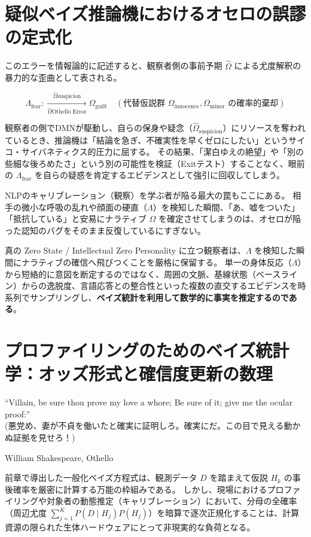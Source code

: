 \section{疑似ベイズ推論機におけるオセロの誤謬の定式化}
このエラーを情報論的に記述すると、観察者側の事前予期 $\hat{\Omega}$ による尤度解釈の暴力的な歪曲として表される。

\begin{equation}
\Lambda_{\mathrm{fear}} :\xrightarrow[\hat{\Omega}{\text{Othello Error}}]{\hat{\Omega}{\mathrm{suspicion}}} \Omega_{\mathrm{guilt}} \quad (\text{代替仮説群 } \Omega_{\mathrm{innocence}}, \Omega_{\mathrm{minor}} \text{ の確率的棄却})
\end{equation}

観察者の側でDMNが駆動し、自らの保身や疑念（$\hat{\Omega}_{\mathrm{suspicion}}$）にリソースを奪われているとき、推論機は「結論を急ぎ、不確実性を早くゼロにしたい」というサイコ・サイバネティクス的圧力に屈する。
その結果、「潔白ゆえの絶望」や「別の些細な後ろめたさ」という別の可能性を検証（Exitテスト）することなく、眼前の $\Lambda_{\mathrm{fear}}$ を自らの疑惑を肯定するエビデンスとして強引に回収してしまう。

NLPのキャリブレーション（観察）を学ぶ者が陥る最大の罠もここにある。
相手の微小な呼吸の乱れや顔面の硬直（$\Lambda$）を検知した瞬間、「あ、嘘をついた」「抵抗している」と安易にナラティブ $\Omega$ を確定させてしまうのは、オセロが陥った認知のバグをそのまま反復しているにすぎない。

真の Zero State / Intellectual Zero Personality に立つ観察者は、$\Lambda$ を検知した瞬間にナラティブの確信へ飛びつくことを厳格に保留する。
単一の身体反応（$\Lambda$）から短絡的に意図を断定するのではなく、周囲の文脈、基線状態（ベースライン）からの逸脱度、言語応答との整合性といった複数の直交するエビデンスを時系列でサンプリングし、\textbf{ベイズ統計を利用して数学的に事実を推定するのである}。

\section{プロファイリングのためのベイズ統計学：オッズ形式と確信度更新の数理}
\epigraph{``Villain, be sure thou prove my love a whore;
Be sure of it; give me the ocular proof:''\\(悪党め、妻が不貞を働いたと確実に証明しろ。確実にだ。この目で見える動かぬ証拠を見せろ！)}{William Shakespeare, Othello}
前章で導出した一般化ベイズ方程式は、観測データ $D$ を踏まえて仮説 $H_k$ の事後確率を厳密に計算する万能の枠組みである。
しかし、現場におけるプロファイリングや対象者の動態推定（キャリブレーション）において、分母の全確率（周辺尤度 $\sum_{j=1}^K P(D \mid H_j) P(H_j)$）を暗算で逐次正規化することは、計算資源の限られた生体ハードウェアにとって非現実的な負荷となる。

